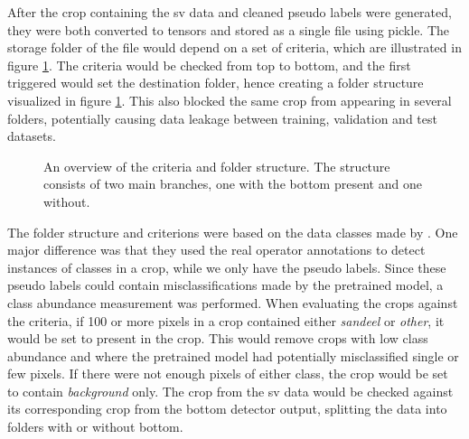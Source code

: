         After the crop containing the \gls{sv} data and cleaned pseudo labels were generated, they were both converted to tensors and stored as a single file using pickle. The storage folder of the file would depend on a set of criteria, which are illustrated in figure \ref{data_hierarchy_fig}. The criteria would be checked from top to bottom, and the first triggered would set the destination folder, hence creating a folder structure visualized in figure \ref{data_hierarchy_fig}. This also blocked the same crop from appearing in several folders, potentially causing data leakage between training, validation and test datasets.
        
        
        \begin{figure}[H]
            \centering
            
            


            \caption[Criteria and folder structure]{An overview of the criteria and folder structure. The structure consists of two main branches, one with the bottom present and one without.}
            
            
          	\medskip 
            \label{data_hierarchy_fig}
        \end{figure}
        

        
        The folder structure and criterions were based on the data classes made by \citeauthor{brautaset2020acoustic}\cite{brautaset2020acoustic}. One major difference was that they used the real operator annotations to detect instances of classes in a crop, while we only have the pseudo labels. Since these pseudo labels could contain misclassifications made by the pretrained model, a class abundance measurement was performed. When evaluating the crops against the criteria, if 100 or more pixels in a crop contained either \textit{sandeel} or \textit{other}, it would be set to present in the crop. This would remove crops with low class abundance and where the pretrained model had potentially misclassified single or few pixels. If there were not enough pixels of either class, the crop would be set to contain \textit{background} only. The crop from the \gls{sv} data would be checked against its corresponding crop from the bottom detector output, splitting the data into folders with or without bottom.
        
